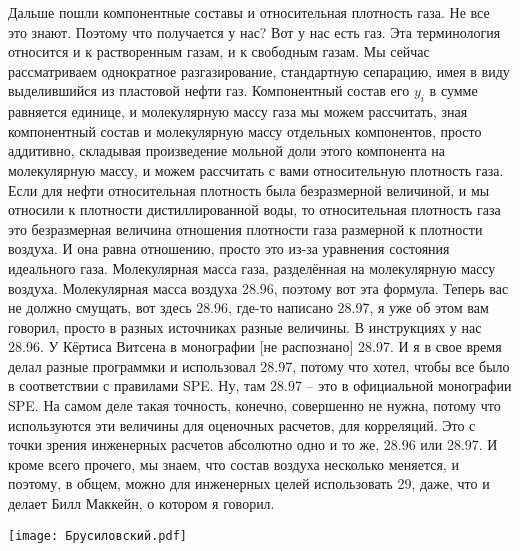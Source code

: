 \documentclass[main.tex]{subfiles}
\begin{document}
Дальше пошли компонентные составы и относительная плотность газа.
Не все это знают.
Поэтому что получается у нас?
Вот у нас есть газ.
Эта терминология относится и к растворенным газам, и к свободным газам.
Мы сейчас рассматриваем однократное разгазирование, стандартную сепарацию, имея в виду выделившийся из пластовой нефти газ.
Компонентный состав его $y_i$ в сумме равняется единице, и молекулярную массу газа мы можем рассчитать, зная компонентный состав и молекулярную массу отдельных компонентов, просто аддитивно, складывая произведение мольной доли этого компонента на молекулярную массу, и можем рассчитать с вами относительную плотность газа.
Если для нефти относительная плотность была безразмерной величиной, и мы относили к плотности дистиллированной воды, то относительная плотность газа это безразмерная величина отношения плотности газа размерной к плотности воздуха.
И она равна отношению, просто это из-за уравнения состояния идеального газа.
Молекулярная масса газа, разделённая на молекулярную массу воздуха.
Молекулярная масса воздуха 28.96, поэтому вот эта формула.
Теперь вас не должно смущать, вот здесь 28.96, где-то написано 28.97, я уже об этом вам говорил, просто в разных источниках разные величины.
В инструкциях у нас 28.96.
У Кёртиса Витсена в монографии [не распознано] %
28.97.
И я в свое время делал разные программки и использовал 28.97, потому что хотел, чтобы все было в соответствии с правилами SPE.
Ну, там 28.97 -- это в официальной монографии SPE.
На самом деле такая точность, конечно, совершенно не нужна, потому что используются эти величины для оценочных расчетов, для корреляций.
Это с точки зрения инженерных расчетов абсолютно одно и то же, 28.96 или 28.97.
И кроме всего прочего, мы знаем, что состав воздуха несколько меняется, и поэтому, в общем, можно для инженерных целей использовать 29, даже, что и делает Билл Маккейн, о котором я говорил.

\begin{center}
\texttt{[image: Брусиловский.pdf]}
\end{center}
\end{document}
